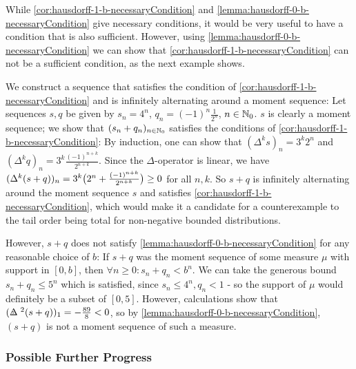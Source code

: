 \documentclass[a4paper]{scrreprt}
\begin{document}
    While \ref{cor:hausdorff-1-b-necessaryCondition} and \ref{lemma:hausdorff-0-b-necessaryCondition} give necessary conditions, it would be very useful to have a condition that is also sufficient. However, using \ref{lemma:hausdorff-0-b-necessaryCondition} we can show that \ref{cor:hausdorff-1-b-necessaryCondition} can not be a sufficient condition, as the next example shows.
    
    \begin{ex}
        We construct a sequence that satisfies the condition of \ref{cor:hausdorff-1-b-necessaryCondition} and is infinitely alternating around a moment sequence:
        Let sequences $s, q$ be given by $s_n = 4^n$, $q_n = (-1)^n\frac{1}{2^n}$, $n \in \mathbb{N}_0$. $s$ is clearly a moment sequence; we show that $(s_n + q_n)_{n \in \mathbb{N}_0}$ satisfies the conditions of \ref{cor:hausdorff-1-b-necessaryCondition}:
        By induction, one can show that $(\Delta^k s)_n = 3^k 2^n$ and $(\Delta^k q)_n = 3^k\frac{(-1)^{n+k}}{2^{n+k}}$.
        Since the $\Delta$-operator is linear, we have $(\Delta^k (s+q))_n = 3^k\bigl(2^n + \frac{(-1)^{n+k}}{2^{n+k}}\bigr) \geq 0$ for all $n, k$.
        So $s+q$ is infinitely alternating around the moment sequence $s$ and satisfies \ref{cor:hausdorff-1-b-necessaryCondition}, which would make it a candidate for a counterexample to the tail order being total for non-negative bounded distributions. 
        
        However, $s+q$ does not satisfy \ref{lemma:hausdorff-0-b-necessaryCondition} for any reasonable choice of $b$:
        If $s+q$ was the moment sequence of some measure $\mu$ with support in $[0, b]$, then $\forall n \geq 0: s_n + q_n < b^n$.
        We can take the generous bound $s_n + q_n \leq 5^n$ which is satisfied, since $s_n \leq 4^n, q_n < 1$ - so the support of $\mu$ would definitely be a subset of $[0, 5]$.
        However, calculations show that $(\DeltaB{5}^2 (s+q))_1 = -\frac{89}{8} < 0$, so by \ref{lemma:hausdorff-0-b-necessaryCondition}, $(s+q)$ is not a moment sequence of such a measure.
    \end{ex}

    \subsubsection{Possible Further Progress}
\end{document}
